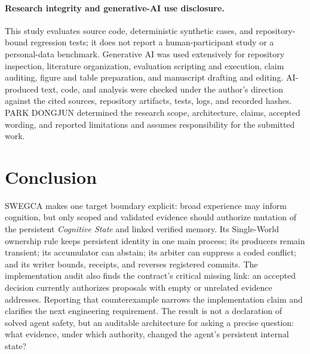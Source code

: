 \documentclass[10pt]{article}
\newcommand{\swegca}{\textsc{SWEGCA}}
\newcommand{\cstate}{\textit{Cognitive State}}
\begin{document}
\paragraph{Research integrity and generative-AI use disclosure.}
This study evaluates source code, deterministic synthetic cases, and repository-bound regression tests; it does not report a human-participant study or a personal-data benchmark. Generative AI was used extensively for repository inspection, literature organization, evaluation scripting and execution, claim auditing, figure and table preparation, and manuscript drafting and editing. AI-produced text, code, and analysis were checked under the author's direction against the cited sources, repository artifacts, tests, logs, and recorded hashes. PARK DONGJUN determined the research scope, architecture, claims, accepted wording, and reported limitations and assumes responsibility for the submitted work.

\section{Conclusion}

\swegca{} makes one target boundary explicit: broad experience may inform cognition, but only scoped and validated evidence should authorize mutation of the persistent \cstate{} and linked verified memory. Its Single-World ownership rule keeps persistent identity in one main process; its producers remain transient; its accumulator can abstain; its arbiter can suppress a coded conflict; and its writer bounds, receipts, and reverses registered commits. The implementation audit also finds the contract's critical missing link: an accepted decision currently authorizes proposals with empty or unrelated evidence addresses. Reporting that counterexample narrows the implementation claim and clarifies the next engineering requirement. The result is not a declaration of solved agent safety, but an auditable architecture for asking a precise question: what evidence, under which authority, changed the agent's persistent internal state?

\begingroup
\scriptsize


\endgroup
\end{document}

